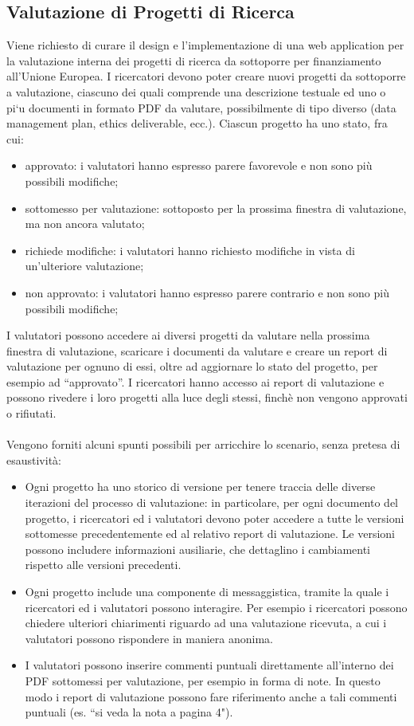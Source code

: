 \documentclass{article}
\begin{document}
\subsection{Valutazione di Progetti di Ricerca}
\par
Viene richiesto di curare il design e l'implementazione di una web application per la valutazione interna dei
progetti di ricerca da sottoporre per finanziamento all'Unione Europea. I ricercatori devono poter creare
nuovi progetti da sottoporre a valutazione, ciascuno dei quali comprende una descrizione testuale ed uno o
pi`u documenti in formato PDF da valutare, possibilmente di tipo diverso (data management plan, ethics
deliverable, ecc.). Ciascun progetto ha uno stato, fra cui:
\begin{itemize}
    \item approvato: i valutatori hanno espresso parere favorevole e non sono più possibili modifiche;
    \item sottomesso per valutazione: sottoposto per la prossima finestra di valutazione, ma non ancora valutato;
    \item richiede modifiche: i valutatori hanno richiesto modifiche in vista di un'ulteriore valutazione;
    \item non approvato: i valutatori hanno espresso parere contrario e non sono più possibili modifiche;
\end{itemize}
I valutatori possono accedere ai diversi progetti da valutare nella prossima finestra di valutazione, scaricare
i documenti da valutare e creare un report di valutazione per ognuno di essi, oltre ad aggiornare lo stato del
progetto, per esempio ad “approvato”. I ricercatori hanno accesso ai report di valutazione e possono rivedere
i loro progetti alla luce degli stessi, finchè non vengono approvati o rifiutati.\\\\Vengono forniti alcuni spunti possibili per arricchire lo scenario, senza pretesa di esaustività:
\begin{itemize}
    \item Ogni progetto ha uno storico di versione per tenere traccia delle diverse iterazioni del processo di
    valutazione: in particolare, per ogni documento del progetto, i ricercatori ed i valutatori devono poter
    accedere a tutte le versioni sottomesse precedentemente ed al relativo report di valutazione. Le versioni
    possono includere informazioni ausiliarie, che dettaglino i cambiamenti rispetto alle versioni precedenti.
    \item Ogni progetto include una componente di messaggistica, tramite la quale i ricercatori ed i valutatori
    possono interagire. Per esempio i ricercatori possono chiedere ulteriori chiarimenti riguardo ad una
    valutazione ricevuta, a cui i valutatori possono rispondere in maniera anonima.
    \item I valutatori possono inserire commenti puntuali direttamente all'interno dei PDF sottomessi per valutazione, per esempio in forma di note. In questo modo i report di valutazione possono fare riferimento
    anche a tali commenti puntuali (es. “si veda la nota a pagina 4").
    
\end{itemize}
\end{document}

